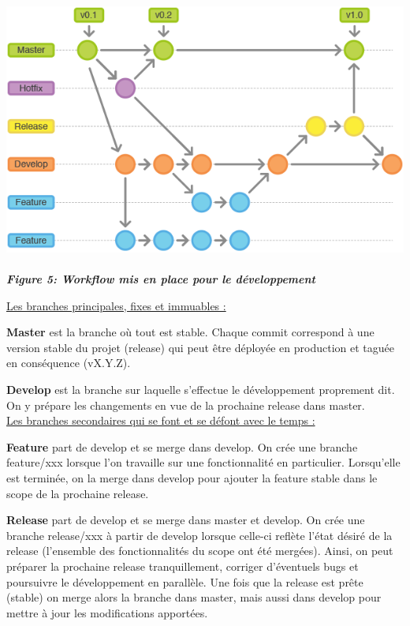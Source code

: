 \documentclass{../res/univ-projet}
\begin{document}
\begin{center}
 \includegraphics[scale=0.6]{./graphics/git_workflow} \\~\\
 \textbf{\textit{Figure 5: Workflow mis en place pour le développement}}
\end{center}

\underline{Les branches principales, fixes et immuables :}

\textbf{Master} est la branche où tout est stable. Chaque commit correspond à une version stable du projet (release) qui peut être déployée en production 
et taguée en conséquence (vX.Y.Z).

\textbf{Develop} est la branche sur laquelle s’effectue le développement proprement dit. On y prépare les changements en vue de la prochaine release dans 
master. \\

\underline{Les branches secondaires qui se font et se défont avec le temps :}

\textbf{Feature} part de develop et se merge dans develop.
On crée une branche feature/xxx lorsque l’on travaille sur une fonctionnalité en particulier. Lorsqu’elle est terminée, on la merge dans develop 
pour ajouter la feature stable dans le scope de la prochaine release.

\textbf{Release} part de develop et se merge dans master et develop.
On crée une branche release/xxx à partir de develop lorsque celle-ci reflète l’état désiré de la release (l’ensemble des fonctionnalités du scope 
ont été mergées). Ainsi, on peut préparer la prochaine release tranquillement, corriger d’éventuels bugs et poursuivre le développement en parallèle. 
Une fois que la release est prête (stable) on merge alors la branche dans master, mais aussi dans develop pour mettre à jour les modifications apportées.
\end{document}
